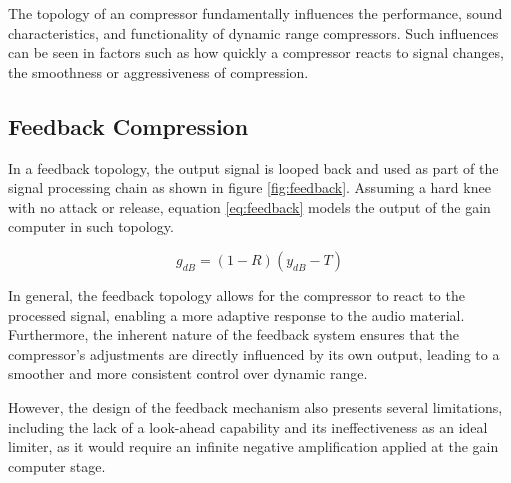 \documentclass[10pt]{article}
\begin{document}
\begin{multicols*}{2}
            \noindent The topology of an compressor fundamentally influences the performance, sound characteristics, and functionality of dynamic range compressors. Such influences can be seen in factors such as how quickly a compressor reacts to signal changes, the smoothness or aggressiveness of compression.

            \subsection{Feedback Compression}
                In a feedback topology, the output signal is looped back and used as part of the signal processing chain as shown in figure \ref{fig:feedback}. Assuming a hard knee with no attack or release, equation \ref{eq:feedback} models the output of the gain computer in such topology.\par

                    \begin{equation} \label{eq:feedback}
                        g_{dB}=(1-R)(y_{dB}-T)
                    \end{equation}
                
                \noindent In general, the feedback topology allows for the compressor to react to the processed signal, enabling a more adaptive response to the audio material. Furthermore, the inherent nature of the feedback system ensures that the compressor's adjustments are directly influenced by its own output, leading to a smoother and more consistent control over dynamic range.\par
                However, the design of the feedback mechanism also presents several limitations, including the lack of a look-ahead capability and its ineffectiveness as an ideal limiter, as it would require an infinite negative amplification applied at the gain computer stage.

                \vspace{2ex}

                    \noindent
                    \begin{minipage}{\linewidth}

                        \centering

\end{minipage}
\end{multicols*}
\end{document}
